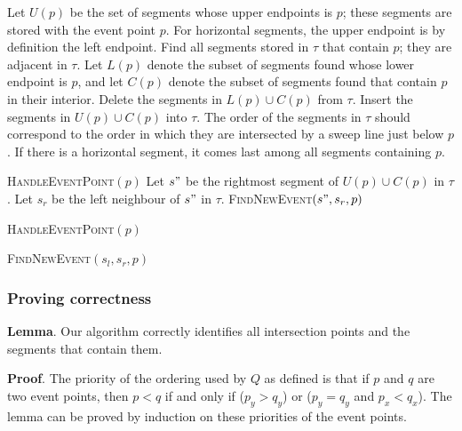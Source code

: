 \documentclass{article}
\begin{document}
\begin{algorithm}[H]
\DontPrintSemicolon 
Let $U(p)$ be the set of segments whose upper endpoints is $p$; these segments are stored with the event point $p$. For horizontal segments, the upper endpoint is by definition the left endpoint.\;
Find all segments stored in $\tau$ that contain $p$; they are adjacent in $\tau$.\;
Let $L(p)$ denote the subset of segments found whose lower endpoint is $p$, and let $C(p)$ denote the subset of segments found that contain $p$ in their interior.\;
Delete the segments in $L(p) \cup C(p)$ from $\tau$.\;
Insert the segments in $U(p) \cup C(p)$ into $\tau$. The order of the segments in $\tau$ should correspond to the order in which they are intersected by a sweep line just below $p$. If there is a horizontal segment, it comes last among all segments containing $p$.\;
\caption{\textsc{HandleEventPoint}$(p)$
Let $s"$ be the rightmost segment of $U(p) \cup C(p)$ in $\tau$.\;
Let $s_r$ be the left neighbour of $s"$ in $\tau$.\;
\textsc{FindNewEvent}$(s",s_r,p)$\;}
\caption{\textsc{HandleEventPoint}$(p)$
}
\end{algorithm}

\begin{algorithm}[H]
\DontPrintSemicolon 
{}
\caption{\textsc{FindNewEvent}$(s_l,s_r,p)$}
\end{algorithm}

\subsubsection{Proving correctness}

\textbf{Lemma}. Our algorithm correctly identifies all intersection points and the segments that contain them.

\textbf{Proof}. The priority of the ordering used by $Q$ as defined is that if $p$ and $q$ are two event points, then $p < q$ if and only if ($p_y > q_y$) or ($p_y = q_y$ and $p_x < q_x$). The lemma can be proved by induction on these priorities of the event points.
\end{document}

